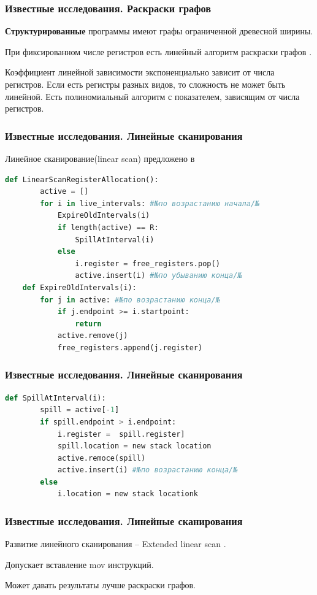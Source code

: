 \documentclass[10pt,a4paper]{beamer}
\begin{document}
\begin{frame}
    \frametitle{Известные исследования. Раскраски графов}
    \textbf{Структурированные} программы имеют графы ограниченной древесной ширины.

    При фиксированном числе регистров есть линейный алгоритм раскраски графов \cite{hans_l_bodlaender_linear-time_1997}.

    Коэффициент линейной зависимости экспоненциально зависит от числа регистров. Если есть регистры разных видов, то сложность не может быть линейной. Есть полиномиальный алгоритм с показателем, зависящим от числа регистров.
\end{frame}

\begin{frame}[fragile]
    \frametitle{Известные исследования. Линейные сканирования}
    Линейное сканирование(linear scan) предложено в \cite{poletto_linear_1999}
    \begin{lstlisting}[language=python]
    def LinearScanRegisterAllocation():
        active = []
        for i in live_intervals: #№по возрастанию начала/№
            ExpireOldIntervals(i)
            if length(active) == R:
                SpillAtInterval(i)
            else
                i.register = free_registers.pop()
                active.insert(i) #№по убыванию конца/№
    def ExpireOldIntervals(i):
        for j in active: #№по возрастанию конца/№
            if j.endpoint >= i.startpoint:
                return
            active.remove(j) 
            free_registers.append(j.register)
    \end{lstlisting}

\end{frame}

\begin{frame}[fragile]
    \frametitle{Известные исследования. Линейные сканирования}
    \begin{lstlisting}[language=python]
    def SpillAtInterval(i):
        spill = active[-1]
        if spill.endpoint > i.endpoint:
            i.register =  spill.register]
            spill.location = new stack location
            active.remoce(spill)
            active.insert(i) #№по возрастанию конца/№
        else
            i.location = new stack locationk
    \end{lstlisting}

\end{frame}

\begin{frame}
    \frametitle{Известные исследования. Линейные сканирования}
    Развитие линейного сканирования -- Extended linear scan \cite{krishnamurthi_extended_2007}.

    Допускает вставление mov инструкций.

    Может давать результаты лучше раскраски графов.
\end{frame}
\end{document}
